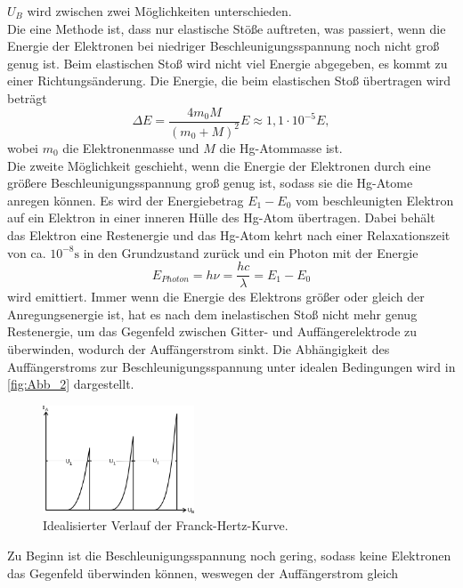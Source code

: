 $U_B$ wird zwischen zwei Möglichkeiten unterschieden.\\
Die eine Methode ist, dass nur elastische Stöße auftreten, was passiert, wenn die Energie der Elektronen bei niedriger Beschleunigungsspannung noch nicht groß genug ist.
Beim elastischen Stoß wird nicht viel Energie abgegeben, es kommt zu einer Richtungsänderung. Die Energie, die beim elastischen Stoß übertragen wird beträgt
\begin{equation*}
    \Delta E = \frac{4m_0M}{(m_0 + M)^2} E \approx 1,1 \cdot 10^{-5} E,
\end{equation*}
wobei $m_0$ die Elektronenmasse und $M$ die Hg-Atommasse ist.\\
Die zweite Möglichkeit geschieht, wenn die Energie der Elektronen durch eine größere Beschleunigungsspannung groß genug ist, 
sodass sie die Hg-Atome anregen können. Es wird der Energiebetrag $E_1-E_0$ vom beschleunigten Elektron auf ein Elektron in einer inneren Hülle des Hg-Atom übertragen.
Dabei behält das Elektron eine Restenergie und das Hg-Atom kehrt nach einer Relaxationszeit von ca. $10^{-8}\si{\second}$ in den Grundzustand zurück 
und ein Photon mit der Energie
\begin{equation}
    E_{Photon} = h \nu = \frac{hc}{\lambda} = E_1 - E_0
    \label{eqn:Anregungspotential}
\end{equation}
wird emittiert.
Immer wenn die Energie des Elektrons größer oder gleich der Anregungsenergie ist, hat
es nach dem inelastischen Stoß nicht mehr genug Restenergie, um das Gegenfeld zwischen
Gitter- und Auffängerelektrode zu überwinden, wodurch der Auffängerstrom sinkt.
Die Abhängigkeit des Auffängerstroms zur Beschleunigungsspannung unter idealen Bedingungen wird in \autoref{fig:Abb_2} dargestellt.
\begin{figure}[H]
    \centering
    \includegraphics[width=0.4\textwidth]{build/Abb_2.png}
    \caption{Idealisierter Verlauf der Franck-Hertz-Kurve\cite{V601}.}
    \label{fig:Abb_2}
\end{figure}
Zu Beginn ist die Beschleunigungsspannung noch gering, sodass keine Elektronen das Gegenfeld überwinden können, weswegen der Auffängerstrom gleich 
